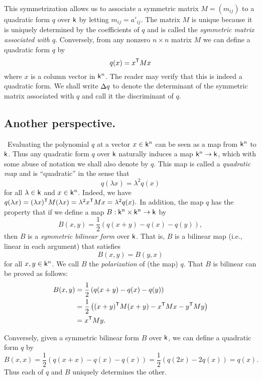 This symmetrization allows us to associate a symmetric matrix \(M = (m_{ij})\) to a quadratic form \(q\) over \(\mathsf{k}\) by letting \(m_{ij} = a'_{ij}\). The matrix \(M\) is unique because it is uniquely determined by the coefficients of \(q\) and is called the \emph{symmetric matrix associated with \(q\)}. Conversely, from any nonzero \(n \times n\) matrix \(M\) we can define a quadratic form \(q\) by
\[
  q(x) = x^{\mathsf{T}}Mx
\]
where \(x\) is a column vector in \(\mathsf{k}^n\). The reader may verify that this is indeed a quadratic form. We shall write \({\Delta} q\) to denote the determinant of the symmetric matrix associated with \(q\) and call it the discriminant of \(q\).\label{sec:quadratic-forms-matrix-representation}

\subsection{Another perspective.}~Evaluating the polynomial \(q\) at a vector \(x \in \mathsf{k}^n\) can be seen as a map from \(\mathsf{k}^n\) to \(\mathsf{k}\). Thus any quadratic form \(q\) over \(\mathsf{k}\) naturally induces a map \(\mathsf{k}^n \to \mathsf{k}\), which with some abuse of notation we shall also denote by \(q\). This map is called a \emph{quadratic map} and is ``quadratic'' in the sense that\label{sec:quadratic-maps}
\[q(\lambda x) = \lambda^2q(x)\]
for all \(\lambda \in \mathsf{k}\) and \(x \in \mathsf{k}^n\). Indeed, we have \(q(\lambda x) = (\lambda x)^{\mathsf{T}}M(\lambda x)  = \lambda^2 x^{\mathsf{T}}Mx = \lambda^2 q(x).\) In addition, the map \(q\) has the property that if we define a map \(B : \mathsf{k}^n \times \mathsf{k}^n \to \mathsf{k}\) by
\[
  B(x, y) = \frac{1}{2}\left(q(x+y) - q(x) - q(y)\right),
\]
then \(B\) is a \emph{symmetric bilinear form} over \(\mathsf{k}\). That is, \(B\) is a bilinear map (i.e., linear in each argument) that satisfies
\[
  B(x, y) = B(y, x)
\]
for all \(x, y \in \mathsf{k}^n\). We call \(B\) the \emph{polarization} of (the map) \(q\). That \(B\) is bilinear can be proved as follows:
\begin{align*}
  B(x,y) &= \frac{1}{2}\left(q(x+y) - q(x) - q(y)\right)\\
  &= \frac{1}{2}\left( (x+y)^{\mathsf{T}}M(x+y) - x^{\mathsf{T}}Mx - y^{\mathsf{T}}My \right)\\
  &= x^{\mathsf{T}}My.
\end{align*}

Conversely, given a symmetric bilinear form \(B\) over \(\mathsf{k}\), we can define a quadratic form \(q\) by
\[B(x, x) = \frac{1}{2}\left(q(x+x) - q(x) - q(x)\right)
=\frac{1}{2}\left(q(2x) - 2q(x)\right) = q(x).\]
Thus each of \(q\) and \(B\) uniquely determines the other.

